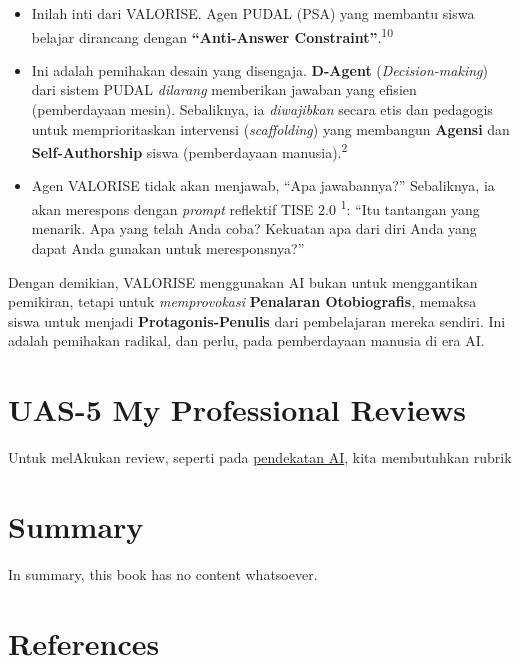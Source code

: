 \documentclass[
  letterpaper,
  DIV=11,
  numbers=noendperiod]{scrreprt}
\begin{document}
\begin{enumerate}
  \begin{itemize}
  \item
    Inilah inti dari VALORISE. Agen PUDAL (PSA) yang membantu siswa
    belajar dirancang dengan \textbf{``Anti-Answer
    Constraint''}.\textsuperscript{10}
  \item
    Ini adalah pemihakan desain yang disengaja. \textbf{D-Agent}
    (\emph{Decision-making}) dari sistem PUDAL \emph{dilarang}
    memberikan jawaban yang efisien (pemberdayaan mesin). Sebaliknya, ia
    \emph{diwajibkan} secara etis dan pedagogis untuk memprioritaskan
    intervensi (\emph{scaffolding}) yang membangun \textbf{Agensi} dan
    \textbf{Self-Authorship} siswa (pemberdayaan
    manusia).\textsuperscript{2}
  \item
    Agen VALORISE tidak akan menjawab, ``Apa jawabannya?'' Sebaliknya,
    ia akan merespons dengan \emph{prompt} reflektif TISE 2.0
    \textsuperscript{1}: ``Itu tantangan yang menarik. Apa yang telah
    Anda coba? Kekuatan apa dari diri Anda yang dapat Anda gunakan untuk
    meresponsnya?''
  \end{itemize}
\end{enumerate}

Dengan demikian, VALORISE menggunakan AI bukan untuk menggantikan
pemikiran, tetapi untuk \emph{memprovokasi} \textbf{Penalaran
Otobiografis}, memaksa siswa untuk menjadi \textbf{Protagonis-Penulis}
dari pembelajaran mereka sendiri. Ini adalah pemihakan radikal, dan
perlu, pada pemberdayaan manusia di era AI.


\chapter{UAS-5 My Professional
Reviews}\label{uas-5-my-professional-reviews}

Untuk melAkukan review, seperti pada
\href{../My_Personal_Reviews/Doc.5.Mengevaluasi-Esai-Berdasarkan-Rubrik.pdf}{pendekatan
AI}, kita membutuhkan rubrik


\chapter{Summary}\label{summary}

In summary, this book has no content whatsoever.


\chapter*{References}\label{references}


\label{refs}
\end{document}
